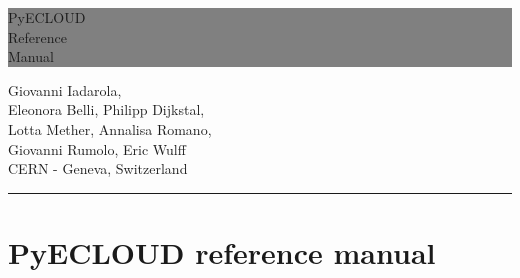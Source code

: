 \documentclass[a4paper,12pt]{article}
\newcommand{\HRule}[1]{\hfill \rule{0.2\linewidth}{#1}}
\begin{document}
\thispagestyle{empty} %


\colorbox{Gray}{
	\parbox[t]{1.0\linewidth}{
		\centering \fontsize{50pt}{80pt}\selectfont %
		\vspace*{0.7cm} %

		\hfill PyECLOUD \\
		\hfill Reference \\
		\hfill Manual\par

		\vspace*{0.7cm} %
	}
}


\vfill %


{\centering \large
\hfill Giovanni Iadarola, \\
\hfill Eleonora Belli, Philipp Dijkstal,\\
\hfill Lotta Mether, Annalisa Romano,\\
\hfill Giovanni Rumolo, Eric Wulff\\
\hfill CERN - Geneva, Switzerland

\HRule{1pt}} %


\clearpage %

\newpage

\section*{PyECLOUD reference manual}
\end{document}
